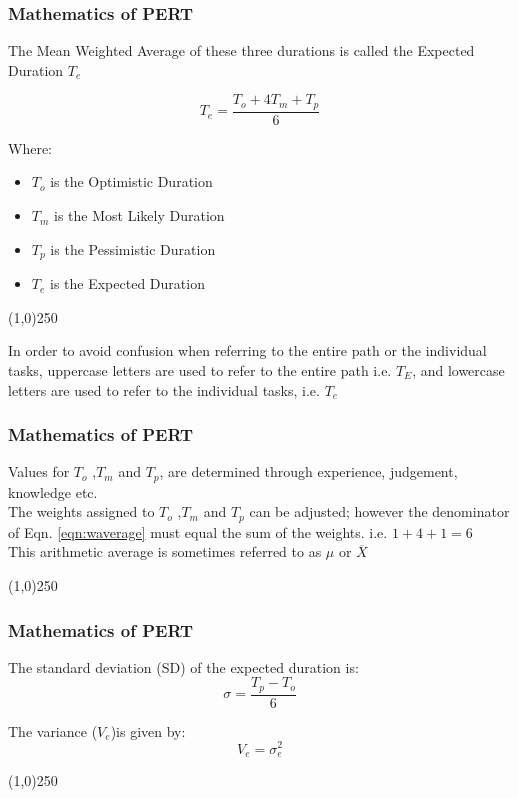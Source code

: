 \begin{frame}
\frametitle{Mathematics of PERT}
The Mean Weighted Average of these three durations is called the Expected Duration $T_e$

\begin{equation}
T_e = \frac{T_o + 4T_m + T_p}{6} \label{eqn:waverage} \tag{PERT-1}	
\end{equation}


Where:\\	
\begin{itemize}
	\item $T_o$ is the Optimistic Duration
	\item $T_m$ is the Most Likely Duration
	\item $T_p$ is the Pessimistic Duration
	\item $T_e$ is the Expected Duration
\end{itemize}
\end{frame}
\begin{center}\line(1,0){250}\end{center}
In order to avoid confusion when referring to the entire path or the individual tasks, uppercase letters are used to refer to the entire path i.e. $T_E$, and lowercase letters are used to refer to the individual tasks, i.e. $T_e$


\begin{frame}
\frametitle{Mathematics of PERT}
Values for $T_o$ ,$T_m$ and $T_p$, are determined through experience, judgement, knowledge etc.\\
The weights assigned to $T_o$ ,$T_m$  and $T_p$ can be adjusted; however the denominator of Eqn. \eqref{eqn:waverage} must equal the sum of the weights.  i.e. $1+4+1 = 6$ \\
This arithmetic average is sometimes referred to as $\mu$ or $\overline{X}$
\end{frame}
\begin{center}\line(1,0){250}\end{center}



\begin{frame}
\frametitle{Mathematics of PERT}
The standard deviation (SD) of the expected duration is:\\
\begin{equation}
\sigma = \frac{T_{p}-T_{o}}{6} \label{eqn:sd} \tag{PERT-2}
\end{equation}

The variance ($V_e$)is given by:\\
\begin{equation}
V_e = \sigma_{e}^2 \label{eqn:var} \tag{PERT-3}
\end{equation}

\end{frame}
\begin{center}\line(1,0){250}\end{center}




